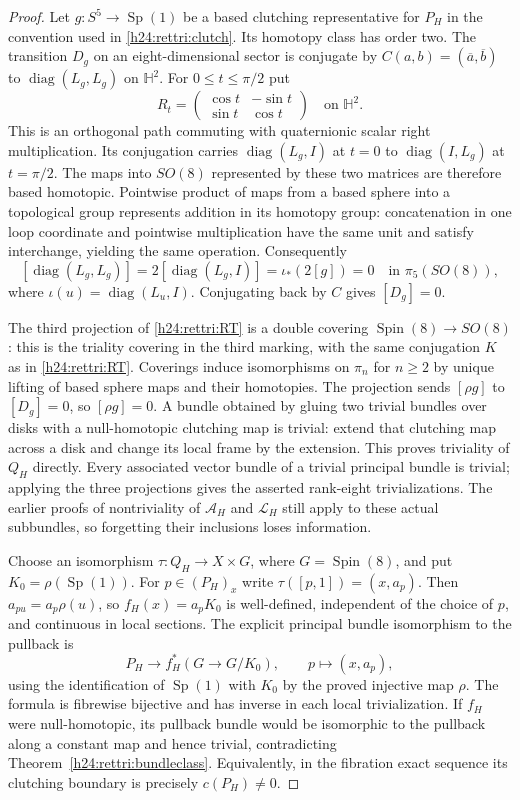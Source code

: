 \begin{proof}
Let $g:S^5\to\operatorname{Sp}(1)$ be a based clutching
representative for $P_H$ in the convention used in
\eqref{h24:rettri:clutch}. Its homotopy class has order two.
The transition $D_g$ on an eight-dimensional sector is conjugate
by $C(a,b)=(\overline a,\overline b)$ to
$\operatorname{diag}(L_g,L_g)$ on $\mathbb H^2$.
For $0\le t\le\pi/2$ put
\[
 R_t=\begin{pmatrix}\cos t&-\sin t\\
                       \sin t&\cos t\end{pmatrix}
       \quad\text{on }\mathbb H^2.
\]
This is an orthogonal path commuting with quaternionic scalar
right multiplication. Its conjugation carries
$\operatorname{diag}(L_g,I)$ at $t=0$ to
$\operatorname{diag}(I,L_g)$ at $t=\pi/2$. The maps into $SO(8)$
represented by these two matrices are therefore based homotopic.
Pointwise product of maps from a based sphere into a topological
group represents addition in its homotopy group: concatenation
in one loop coordinate and pointwise multiplication have the
same unit and satisfy interchange, yielding the same operation.
Consequently
\[
 [\operatorname{diag}(L_g,L_g)]
 =2[\operatorname{diag}(L_g,I)]
 =\iota_*(2[g])=0\quad\text{in }\pi_5(SO(8)),
\]
where $\iota(u)=\operatorname{diag}(L_u,I)$. Conjugating back by
$C$ gives $[D_g]=0$.

The third projection of \eqref{h24:rettri:RT} is a double covering
$\operatorname{Spin}(8)\to SO(8)$: this is the triality covering
in the third marking, with the same conjugation $K$ as in
\eqref{h24:rettri:RT}. Coverings induce isomorphisms on
$\pi_n$ for $n\ge2$ by unique lifting of based sphere maps and
their homotopies. The projection sends $[\rho g]$ to $[D_g]=0$,
so $[\rho g]=0$. A bundle obtained by gluing two trivial bundles
over disks with a null-homotopic clutching map is trivial: extend
that clutching map across a disk and change its local frame by
the extension. This proves triviality of $Q_H$ directly.
Every associated vector bundle of a trivial principal bundle is
trivial; applying the three projections gives the asserted
rank-eight trivializations. The earlier proofs of nontriviality
of $\mathcal A_H$ and $\mathcal L_H$ still apply to these actual
subbundles, so forgetting their inclusions loses information.

Choose an isomorphism $\tau:Q_H\to X\times G$, where
$G=\operatorname{Spin}(8)$, and put $K_0=\rho(\operatorname{Sp}(1))$.
For $p\in(P_H)_x$ write $\tau([p,1])=(x,a_p)$. Then
$a_{pu}=a_p\rho(u)$, so
$f_H(x)=a_p K_0$ is well-defined, independent of the choice of
$p$, and continuous in local sections. The explicit principal
bundle isomorphism to the pullback is
\[
 P_H\longrightarrow f_H^*(G\to G/K_0),\qquad
 p\longmapsto(x,a_p),
\]
using the identification of $\operatorname{Sp}(1)$ with $K_0$
by the proved injective map $\rho$. The formula is fibrewise
bijective and has inverse in each local trivialization.
If $f_H$ were null-homotopic, its pullback bundle would be
isomorphic to the pullback along a constant map and hence
trivial, contradicting Theorem~\ref{h24:rettri:bundleclass}.
Equivalently, in the fibration exact sequence its clutching
boundary is precisely $c(P_H)\ne0$.
\end{proof}

